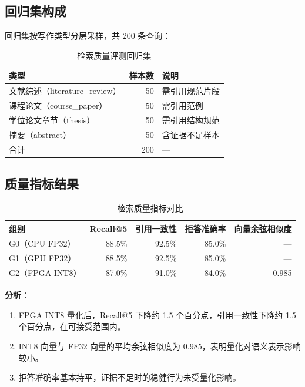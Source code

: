 \subsection{回归集构成}
回归集按写作类型分层采样，共 200 条查询：
\begin{table}[htbp]
  \centering
  \caption{检索质量评测回归集}
  \begin{tabular}{lrl}
    \toprule
    类型 & 样本数 & 说明 \\
    \midrule
    文献综述（literature\_review） & 50 & 需引用规范片段 \\
    课程论文（course\_paper） & 50 & 需引用范例 \\
    学位论文章节（thesis） & 50 & 需引用结构规范 \\
    摘要（abstract） & 50 & 含证据不足样本 \\
    \midrule
    合计 & 200 & — \\
    \bottomrule
  \end{tabular}
\end{table}

\subsection{质量指标结果}
\begin{table}[htbp]
  \centering
  \caption{检索质量指标对比}
  \label{tab:quality}
  \begin{tabular}{lrrrr}
    \toprule
    组别 & Recall@5 & 引用一致性 & 拒答准确率 & 向量余弦相似度 \\
    \midrule
    G0（CPU FP32） & 88.5\% & 92.5\% & 85.0\% & — \\
    G1（GPU FP32） & 88.5\% & 92.5\% & 85.0\% & — \\
    G2（FPGA INT8） & 87.0\% & 91.0\% & 84.0\% & 0.985 \\
    \bottomrule
  \end{tabular}
\end{table}

\textbf{分析}：
\begin{enumerate}[label=(\arabic*)]
  \item FPGA INT8 量化后，Recall@5 下降约 1.5 个百分点，引用一致性下降约 1.5 个百分点，在可接受范围内。
  \item INT8 向量与 FP32 向量的平均余弦相似度为 0.985，表明量化对语义表示影响较小。
  \item 拒答准确率基本持平，证据不足时的稳健行为未受量化影响。
\end{enumerate}

